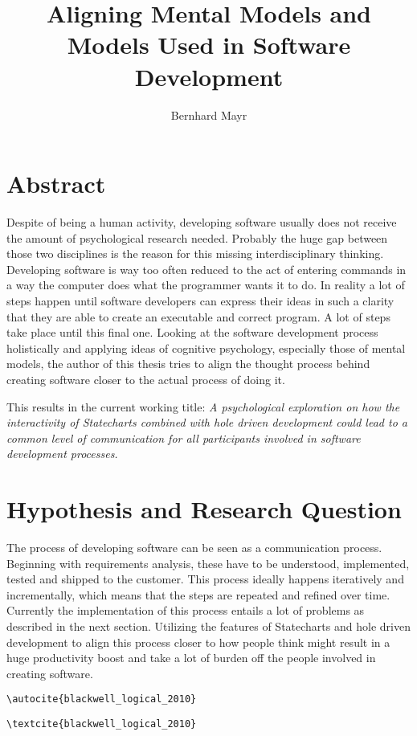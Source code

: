 \documentclass[a4paper, bibliography=totoc, oneside, 12pt]{scrbook}
\title{Aligning Mental Models and Models Used in Software Development}
\author{Bernhard Mayr}
\begin{document}
\makeatletter


\frontmatter
\setcounter{page}{2}
\tableofcontents
\mainmatter

\chapter{Abstract}
Despite of being a human activity, developing software usually does not receive the amount of psychological research needed. Probably the huge gap between those two disciplines is the reason for this missing interdisciplinary thinking. Developing software is way too often reduced to the act of entering commands in a way the computer does what the programmer wants it to do. In reality a lot of steps happen until software developers can express their ideas in such a clarity that they are able to create an executable and correct program. A lot of steps take place until this final one. Looking at the software development process holistically and applying ideas of cognitive psychology, especially those of mental models, the author of this thesis tries to align the thought process behind creating software closer to the actual process of doing it.

This results in the current working title: \emph{A psychological exploration on how the interactivity of Statecharts combined with hole driven development could lead to a common level of communication for all participants involved in software development processes.}


\chapter{Hypothesis and Research Question}
The process of developing software can be seen as a communication process. Beginning with requirements analysis, these have to be understood, implemented, tested and shipped to the customer. This process ideally happens iteratively and incrementally, which means that the steps are repeated and refined over time.
Currently the implementation of this process entails a lot of problems as described in the next section.
Utilizing the features of Statecharts and hole driven development to align this process closer to how people think might result in a huge productivity boost and take a lot of burden off the people involved in creating software.

\verb+\autocite{blackwell_logical_2010}+ \textrightarrow{} \textbf{\autocite{blackwell_logical_2010}}

\verb+\textcite{blackwell_logical_2010}+ \textrightarrow{} \textbf{\textcite{blackwell_logical_2010}}
\end{document}

